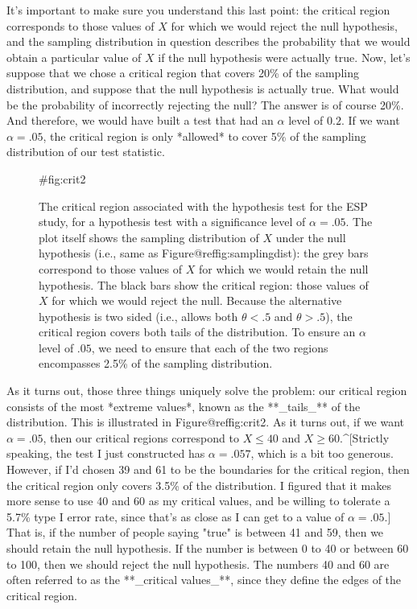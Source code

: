 It's important to make sure you understand this last point: the critical region corresponds to those values of $X$ for which we would reject the null hypothesis, and the sampling distribution in question describes the probability that we would obtain a particular value of $X$ if the null hypothesis were actually true. Now, let's suppose that we chose a critical region that covers 20\% of the sampling distribution, and suppose that the null hypothesis is actually true. What would be the probability of incorrectly rejecting the null? The answer is of course 20\%. And therefore, we would have built a test that had an $\alpha$ level of $0.2$. If we want $\alpha = .05$, the critical region is only *allowed* to cover 5\% of the sampling distribution of our test statistic.


\begin{figure}[t]
\begin{center}
\caption{The critical region associated with the hypothesis test for the ESP study, for a hypothesis test with a significance level of $\alpha = .05$. The plot itself shows the sampling distribution of $X$ under the null hypothesis (i.e., same as Figure@reffig:samplingdist): the grey bars correspond to those values of $X$ for which we would retain the null hypothesis. The black bars show the critical region: those values of $X$ for which we would reject the null. Because the alternative hypothesis is two sided (i.e., allows both $\theta <.5$ and $\theta >.5$), the critical region covers both tails of the distribution. To ensure an $\alpha$ level of $.05$, we need to ensure that each of the two regions encompasses 2.5\% of the sampling distribution. }
\HR
{#fig:crit2}
\end{center}
\end{figure}

As it turns out, those three things uniquely solve the problem: our critical region consists of the most *extreme values*, known as the **_tails_** of the distribution. This is illustrated in Figure@reffig:crit2. As it turns out, if we want $\alpha = .05$, then our critical regions correspond to $X \leq 40$ and $X \geq 60$.^[Strictly speaking, the test I just constructed has $\alpha = .057$, which is a bit too generous. However, if I'd chosen 39 and 61 to be the boundaries for the critical region, then the critical region only covers 3.5\% of the distribution. I figured that it makes more sense to use 40 and 60 as my critical values, and be willing to tolerate a 5.7\% type I error rate, since that's as close as I can get to a value of $\alpha = .05$.] That is, if the number of people saying "true" is between 41 and 59, then we should retain the null hypothesis. If the number is between 0 to 40 or between 60 to 100, then we should reject the null hypothesis. The numbers 40 and 60 are often referred to as the **_critical values_**, since they define the edges of the critical region.


